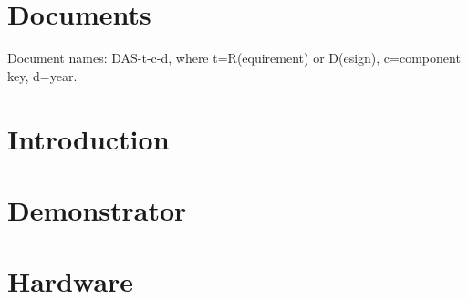 \documentclass{dabcclass}
\begin{document}
 \cleardoublepage
\thispagestyle{empty} \tableofcontents \thispagestyle{empty} \cleardoublepage
{}

 \cleardoublepage
 \cleardoublepage
 \cleardoublepage

\setcounter{chapter}{0}
\chapter{Documents}
Document names: DAS-t-c-d, where t=R(equirement) or D(esign), c=component key, d=year.\\







\cleardoublepage
\chapter{Introduction}
 \cleardoublepage
\chapter{Demonstrator}
 \cleardoublepage
\chapter{Hardware}
 \cleardoublepage
\end{document}
